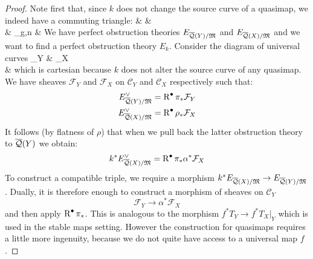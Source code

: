 \begin{proof} Note first that, since $k$ does not change the source curve of a quasimap, we indeed have a commuting triangle:
\bcd
{} \ar[rr,"k"] \ar[rd] & &  \ar[ld] \\
& \MM_{g,n} & 
\ecd
We have perfect obstruction theories $E_{\overline{\mathcal{Q}}(Y)/\mathfrak M}$ and $E_{\overline{\mathcal{Q}}(X)/\mathfrak M}$ and we want to find a perfect obstruction theory $E_k$. Consider the diagram of universal curves
\bcd
{}_Y \ar[r,"\alpha"] \ar[d,"\pi"]  & _{X} \ar[d,"\rho"] \\
 \ar[r,"k"] & 
\ecd
which is cartesian because $k$ does not alter the source curve of any quasimap. We have sheaves $\mathcal{F}_Y$ and $\mathcal{F}_{X}$ on $\mathcal{C}_Y$ and $\mathcal{C}_{X}$ respectively such that:
\begin{align*} E_{\overline{\mathcal{Q}}(Y)/\mathfrak M}^\vee & = \operatorname{R}^{\bullet} \pi_* \mathcal{F}_Y \\
E_{\overline{\mathcal{Q}}(X)/\mathfrak M}^\vee & = \operatorname{R}^{\bullet} \rho_* \mathcal{F}_{X} \end{align*}
It follows (by flatness of $\rho$) that when we pull back the latter obstruction theory to $\overline{\mathcal{Q}}(Y)$ we obtain:
\begin{equation*} k^* E_{\overline{\mathcal{Q}}(X)/\mathfrak M}^\vee = \operatorname{R}^{\bullet} \pi_* \alpha^* \mathcal{F}_{X} \end{equation*}
To construct a compatible triple, we require a morphism $k^* E_{\overline{\mathcal{Q}}(X)/\mathfrak M} \rightarrow E_{\overline{\mathcal{Q}}(Y)/\mathfrak M}$. Dually, it is therefore enough to construct a morphism of sheaves on $\mathcal{C}_Y$
\begin{equation*} \mathcal{F}_Y \to \alpha^* \mathcal{F}_{X} \end{equation*}
and then apply $\operatorname{R}^{\bullet} \pi_*$. This is analogous to the morphism $f^* T_Y \to f^* T_{X}|_Y$ which is used in the stable maps setting. However the construction for quasimaps requires a little more ingenuity, because we do not quite have access to a universal map $f$.


\end{proof}
